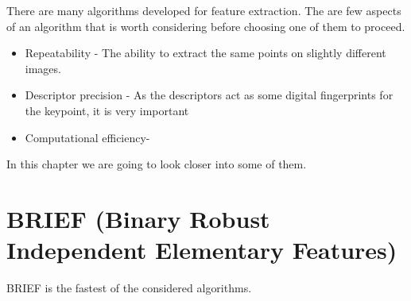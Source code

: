 \documentclass[11pt]{book}
\begin{document}
There are many algorithms developed for feature extraction. The are few aspects of an algorithm that is worth considering before choosing one of them to proceed.

\begin{itemize}
 \item Repeatability - The ability to extract the same points on slightly different images. 
 \item Descriptor precision - As the descriptors act as some digital fingerprints for the keypoint, it is very important 
 \item Computational efficiency-
\end{itemize}


In this chapter we are going to look closer into some of them.  


\section{BRIEF (Binary Robust Independent Elementary Features)}

BRIEF is the fastest of the considered algorithms. 






\backmatter
\end{document}
